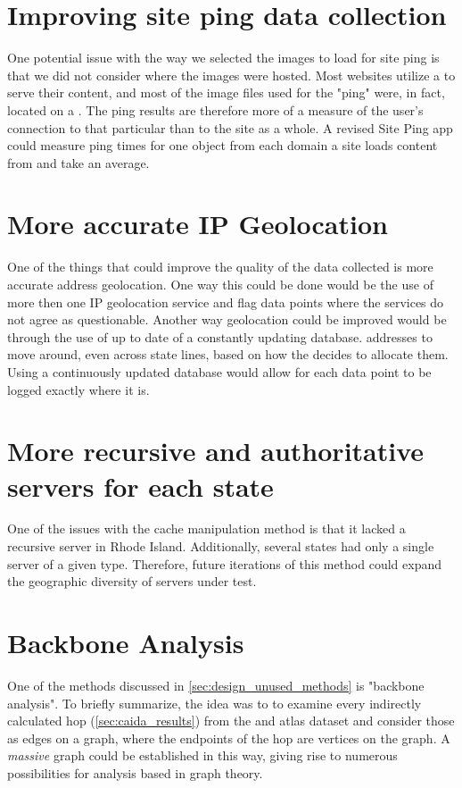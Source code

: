 \section{Improving site ping data collection}

One potential issue with the way we selected the images to load for site ping is that we did not consider where the images were hosted. Most websites utilize a \cdn to serve their content, and most of the image files used for the "ping" were, in fact, located on a \cdn. The ping results are therefore more of a measure of the user's connection to that particular \cdn than to the site as a whole. A revised Site Ping app could measure ping times for one object from each domain a site loads content from and take an average.

\section{More accurate IP Geolocation}

One of the things that could improve the quality of the data collected is more accurate \ip address geolocation. One way this could be done would be the use of more then one IP geolocation service and flag data points where the services do not agree as questionable. Another way geolocation could be improved would be through the use of up to date of a constantly updating database. \ip addresses to move around, even across state lines, based on how the \isp decides to allocate them. Using a continuously updated database would allow for each data point to be logged exactly where it is.

\section{More recursive and authoritative servers for each state}

One of the issues with the \dns cache manipulation method is that it lacked a recursive \dns server in Rhode Island. Additionally, several states had only a single server of a given type. Therefore, future iterations of this method could expand the geographic diversity of servers under test.

\section{Backbone Analysis}

One of the methods discussed in \cref{sec:design_unused_methods} is "backbone analysis". To briefly summarize, the idea was to to examine every indirectly calculated hop (\cref{sec:caida_results}) from the \caida and \ripe atlas dataset and consider those as edges on a graph, where the endpoints of the hop are vertices on the graph. A \textit{massive} graph could be established in this way, giving rise to numerous possibilities for analysis based in graph theory.

